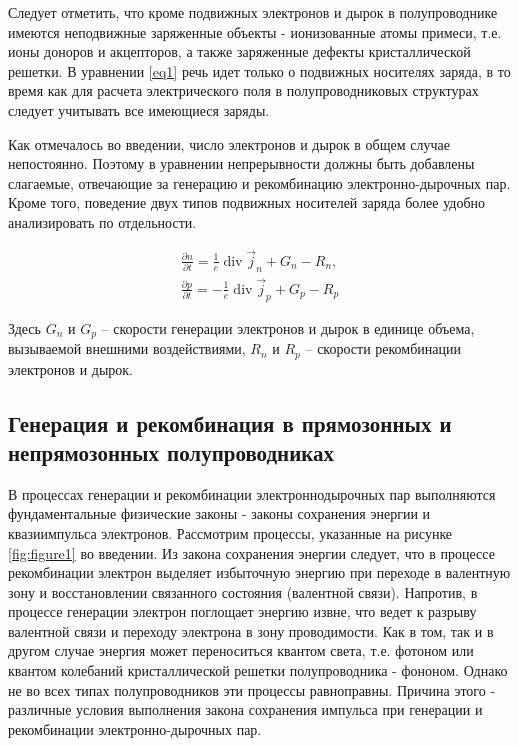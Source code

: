 \documentclass[a4paper,12pt]{article}
\DeclareMathOperator{\Div}{div}
\begin{document}
Следует отметить, что кроме подвижных электронов и дырок в полупроводнике имеются неподвижные заряженные объекты - ионизованные атомы примеси, т.е. ионы доноров и акцепторов, а также заряженные дефекты кристаллической решетки. В уравнении \eqref{eq1} речь идет только о подвижных носителях заряда, в то время как для расчета электрического поля в полупроводниковых структурах следует учитывать все имеющиеся заряды.

Как отмечалось во введении, число электронов и дырок в общем случае непостоянно. Поэтому в уравнении непрерывности должны быть добавлены слагаемые, отвечающие за генерацию и рекомбинацию электронно-дырочных пар. Кроме того, поведение двух типов подвижных носителей заряда более удобно анализировать по отдельности.

\begin{gather}
	\label{eq2}
	\frac{\partial n}{\partial t}=\frac{1}{e} \Div \vec{j}_{n}+G_{n}-R_{n},\\ \nonumber
	\frac{\partial p}{\partial t}=-\frac{1}{e} \Div \vec{j}_{p}+G_{p}-R_{p}
\end{gather}

Здесь $G_n$ и $G_p$ -- скорости генерации электронов и дырок в единице объема, вызываемой внешними воздействиями, $R_n$ и $R_p$ -- скорости рекомбинации электронов и дырок.

\subsection{Генерация и рекомбинация в прямозонных и непрямозонных полупроводниках}

В процессах генерации и рекомбинации электроннодырочных пар выполняются фундаментальные физические законы - законы сохранения энергии и квазиимпульса электронов. Рассмотрим процессы, указанные на рисунке \ref{fig:figure1} во введении. Из закона сохранения энергии следует, что в процессе рекомбинации электрон выделяет избыточную энергию при переходе в валентную зону и восстановлении связанного состояния (валентной связи). Напротив, в процессе генерации электрон поглощает энергию извне, что ведет к разрыву валентной связи и переходу электрона в зону проводимости. Как в том, так и в другом случае энергия может переноситься квантом света, т.е. фотоном или квантом колебаний кристаллической решетки полупроводника - фононом. Однако не во всех типах полупроводников эти процессы равноправны. Причина этого - различные условия выполнения закона сохранения импульса при генерации и рекомбинации электронно-дырочных пар.
\end{document}
